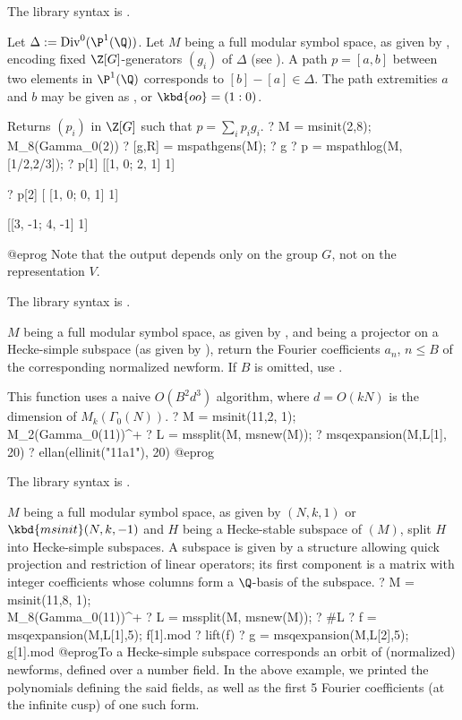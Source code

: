 The library syntax is .

\label{se:mspathlog}
Let $\Delta:=\text{Div}^0(\P^1(\Q))$.
Let $M$ being a full modular symbol space, as given by ,
encoding fixed $\Z[G]$-generators $(g_i)$ of $\Delta$ (see ).
A path $p=[a,b]$ between two elements in $\P^1(\Q)$ corresponds to
$[b]-[a]\in \Delta$. The path extremities $a$ and $b$ may be given as
,  or $\kbd{oo} = (1:0)$.

Returns $(p_i)$ in $\Z[G]$ such that $p = \sum_i p_i g_i$.
\bprog
? M = msinit(2,8); \\ M_8(Gamma_0(2))
? [g,R] = mspathgens(M);
? g
? p = mspathlog(M, [1/2,2/3]);
? p[1]
[[1, 0; 2, 1] 1]

? p[2]
[  [1, 0; 0, 1] 1]

[[3, -1; 4, -1] 1]

@eprog\noindent
Note that the output depends only on the group $G$, not on the
representation $V$.

The library syntax is .

\label{se:msqexpansion}
$M$ being a full modular symbol space, as given by ,
and  being a projector on a Hecke-simple subspace (as given
by ), return the Fourier coefficients $a_n$, $n\leq B$ of the
corresponding normalized newform. If $B$ is omitted, use
.

This function uses a naive $O(B^2 d^3)$
algorithm, where $d = O(kN)$ is the dimension of $M_k(\Gamma_0(N))$.
\bprog
? M = msinit(11,2, 1); \\ M_2(Gamma_0(11))^+
? L = mssplit(M, msnew(M));
? msqexpansion(M,L[1], 20)
? ellan(ellinit("11a1"), 20)
@eprog

The library syntax is .

\label{se:mssplit}
$M$ being a full modular symbol space, as given by $(N,k,1)$
or $\kbd{msinit}(N,k,-1)$
and $H$ being a Hecke-stable subspace of $(M)$, split $H$ into
Hecke-simple subspaces.
A subspace is given by a structure allowing quick projection and restriction
of linear operators; its first component is a matrix with integer
coefficients whose columns form a $\Q$-basis of the subspace.
\bprog
? M = msinit(11,8, 1); \\ M_8(Gamma_0(11))^+
? L = mssplit(M, msnew(M));
? #L
? f = msqexpansion(M,L[1],5); f[1].mod
? lift(f)
? g = msqexpansion(M,L[2],5); g[1].mod
@eprog\noindent To a Hecke-simple subspace corresponds an orbit of
(normalized) newforms, defined over a number field. In the above example,
we printed the polynomials defining the said fields, as well as the first
5 Fourier coefficients (at the infinite cusp) of one such form.

